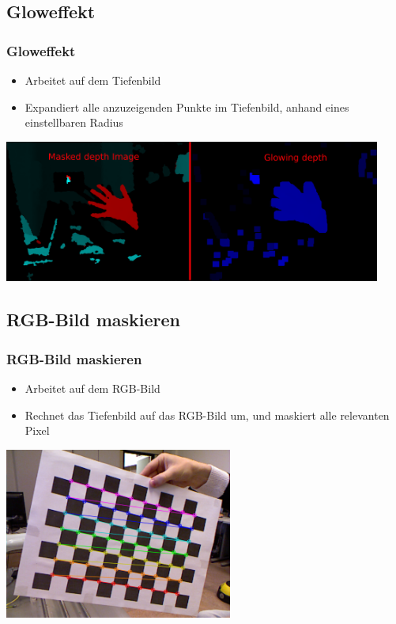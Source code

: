 \documentclass{beamer}
\begin{document}
\subsection{Gloweffekt}
\begin{frame}
\frametitle{Gloweffekt}
\begin{itemize}
	\item Arbeitet auf dem Tiefenbild
	\item Expandiert alle anzuzeigenden Punkte im Tiefenbild, anhand eines einstellbaren Radius
\end{itemize}
\vspace*{0.5cm}
\includegraphics[width=12.4cm]{filter3.png}
\end{frame}

\subsection{RGB-Bild maskieren}
\begin{frame}
\frametitle{RGB-Bild maskieren}
\begin{itemize}
	\item Arbeitet auf dem RGB-Bild
	\item Rechnet das Tiefenbild auf das RGB-Bild um, und maskiert alle relevanten Pixel
\end{itemize}

\hspace*{2.2cm}\includegraphics[width=7.5cm]{trans.png}
\end{frame}
\end{document}
